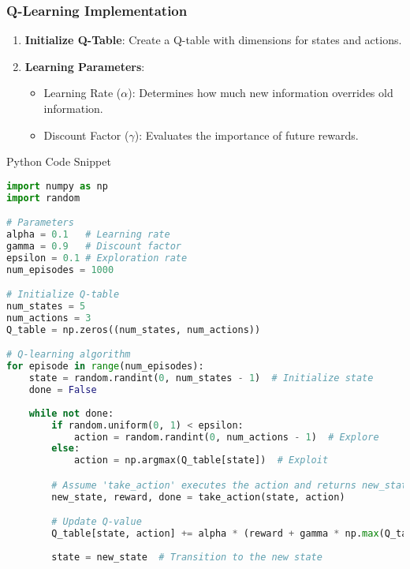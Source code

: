 \documentclass[aspectratio=169]{beamer}
\begin{document}
\begin{frame}[fragile]
    \frametitle{Q-Learning Implementation}
    \begin{enumerate}
        \item \textbf{Initialize Q-Table}: Create a Q-table with dimensions for states and actions.
        \item \textbf{Learning Parameters}:
        \begin{itemize}
            \item Learning Rate ($\alpha$): Determines how much new information overrides old information.
            \item Discount Factor ($\gamma$): Evaluates the importance of future rewards.
        \end{itemize}
    \end{enumerate}
    \begin{block}{Python Code Snippet}
        \begin{lstlisting}[language=Python]
import numpy as np
import random

# Parameters
alpha = 0.1   # Learning rate
gamma = 0.9   # Discount factor
epsilon = 0.1 # Exploration rate
num_episodes = 1000

# Initialize Q-table
num_states = 5
num_actions = 3
Q_table = np.zeros((num_states, num_actions))

# Q-learning algorithm
for episode in range(num_episodes):
    state = random.randint(0, num_states - 1)  # Initialize state
    done = False
    
    while not done:
        if random.uniform(0, 1) < epsilon:
            action = random.randint(0, num_actions - 1)  # Explore
        else:
            action = np.argmax(Q_table[state])  # Exploit

        # Assume 'take_action' executes the action and returns new_state and reward
        new_state, reward, done = take_action(state, action)

        # Update Q-value
        Q_table[state, action] += alpha * (reward + gamma * np.max(Q_table[new_state]) - Q_table[state, action])
        
        state = new_state  # Transition to the new state
        \end{lstlisting}
    \end{block}
\end{frame}
\end{document}

